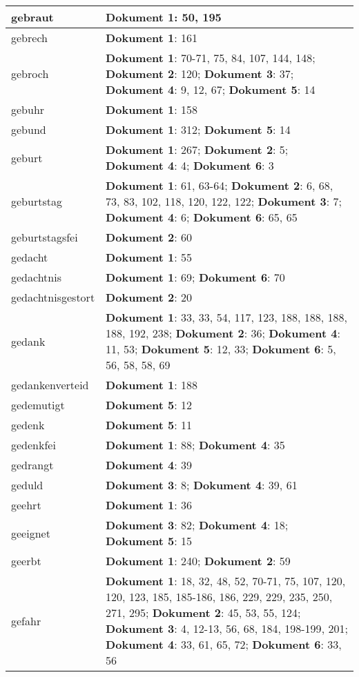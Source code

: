 \documentclass[a5paper]{article}
\begin{document}
\begin{longtable}[l]{|l|p{3in}|}
gebraut & \textbf{Dokument 1}: 50, 195 \\
\hline
gebrech & \textbf{Dokument 1}: 161 \\
\hline
gebroch & \textbf{Dokument 1}: 70-71, 75, 84, 107, 144, 148; \textbf{Dokument 2}: 120; \textbf{Dokument 3}: 37; \textbf{Dokument 4}: 9, 12, 67; \textbf{Dokument 5}: 14 \\
\hline
gebuhr & \textbf{Dokument 1}: 158 \\
\hline
gebund & \textbf{Dokument 1}: 312; \textbf{Dokument 5}: 14 \\
\hline
geburt & \textbf{Dokument 1}: 267; \textbf{Dokument 2}: 5; \textbf{Dokument 4}: 4; \textbf{Dokument 6}: 3 \\
\hline
geburtstag & \textbf{Dokument 1}: 61, 63-64; \textbf{Dokument 2}: 6, 68, 73, 83, 102, 118, 120, 122, 122; \textbf{Dokument 3}: 7; \textbf{Dokument 4}: 6; \textbf{Dokument 6}: 65, 65 \\
\hline
geburtstagsfei & \textbf{Dokument 2}: 60 \\
\hline
gedacht & \textbf{Dokument 1}: 55 \\
\hline
gedachtnis & \textbf{Dokument 1}: 69; \textbf{Dokument 6}: 70 \\
\hline
gedachtnisgestort & \textbf{Dokument 2}: 20 \\
\hline
gedank & \textbf{Dokument 1}: 33, 33, 54, 117, 123, 188, 188, 188, 188, 192, 238; \textbf{Dokument 2}: 36; \textbf{Dokument 4}: 11, 53; \textbf{Dokument 5}: 12, 33; \textbf{Dokument 6}: 5, 56, 58, 58, 69 \\
\hline
gedankenverteid & \textbf{Dokument 1}: 188 \\
\hline
gedemutigt & \textbf{Dokument 5}: 12 \\
\hline
gedenk & \textbf{Dokument 5}: 11 \\
\hline
gedenkfei & \textbf{Dokument 1}: 88; \textbf{Dokument 4}: 35 \\
\hline
gedrangt & \textbf{Dokument 4}: 39 \\
\hline
geduld & \textbf{Dokument 3}: 8; \textbf{Dokument 4}: 39, 61 \\
\hline
geehrt & \textbf{Dokument 1}: 36 \\
\hline
geeignet & \textbf{Dokument 3}: 82; \textbf{Dokument 4}: 18; \textbf{Dokument 5}: 15 \\
\hline
geerbt & \textbf{Dokument 1}: 240; \textbf{Dokument 2}: 59 \\
\hline
gefahr & \textbf{Dokument 1}: 18, 32, 48, 52, 70-71, 75, 107, 120, 120, 123, 185, 185-186, 186, 229, 229, 235, 250, 271, 295; \textbf{Dokument 2}: 45, 53, 55, 124; \textbf{Dokument 3}: 4, 12-13, 56, 68, 184, 198-199, 201; \textbf{Dokument 4}: 33, 61, 65, 72; \textbf{Dokument 6}: 33, 56 \\

\end{longtable}
\end{document}
